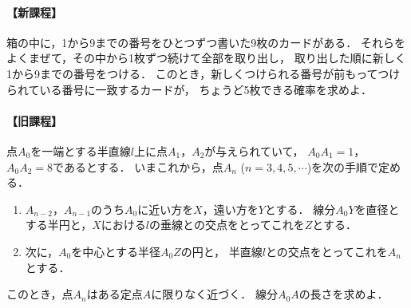 \documentclass[../../main.tex]{subfiles}
\begin{document}
\paragraph{【新課程】}
箱の中に，1から9までの番号をひとつずつ書いた9枚のカードがある．
それらをよくまぜて，その中から1枚ずつ続けて全部を取り出し，
取り出した順に新しく1から9までの番号をつける．
このとき，新しくつけられる番号が前もってつけられている番号に一致するカードが，
ちょうど5枚できる確率を求めよ．

\paragraph{【旧課程】}
点$A_0$を一端とする半直線$l$上に点$A_1$，$A_2$が与えられていて，
$A_0A_1=1$，$A_0A_2=8$であるとする．
いまこれから，点$A_n$ ($n=3, 4, 5, \cdots$)を次の手順で定める．
\begin{enumerate}[(1)]
  \item $A_{n-2}$，$A_{n-1}$のうち$A_0$に近い方を$X$，遠い方を$Y$とする．
    線分$A_0Y$を直径とする半円と，$X$における$l$の垂線との交点をとってこれを$Z$とする．
  \item 次に，$A_0$を中心とする半径$A_0Z$の円と，
    半直線$l$との交点をとってこれを$A_n$とする．
\end{enumerate}
このとき，点$A_n$はある定点$A$に限りなく近づく．
線分$A_0A$の長さを求めよ．
\end{document}
